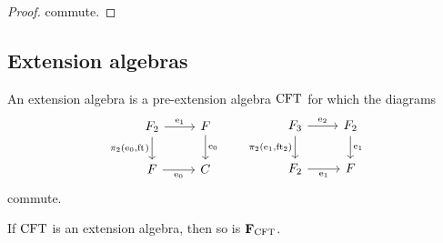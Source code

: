 \begin{proof}
commute.
\begin{comment}
\begin{equation*}
\begin{tikzcd}[column sep=large]
{} &
\stesysf_2'
  \ar{r}{f_2}
  \ar{dr}{\beta_1'}
  &
\stesysf_2
  \ar{ddr}{\pullbackpr{2}{\ectxext}{\eft}}
  \\
{} & {} &
\stesysf'
  \ar{dr}[swap,near start]{f_1}
  \\
\stesysf_3'
  \ar{uur}{\eext{2}'}
  \ar{r}{\beta_2'}
  \ar{dr}[swap]{f_3}
  &
\stesysf_2'
  \ar{r}{f_2}
  \ar{ur}{\efamext'}
  &
\stesysf_2
  \ar{r}[swap]{\efamext}
  &
\stesysf
  \\
{} &
\stesysf_3
  \ar{r}[swap]{\eext{2}}
  \ar{ur}[near start]{\beta_2}
  &
\stesysf_2
  \ar{ur}[swap]{\pullbackpr{2}{\ectxext}{\eft}}
\end{tikzcd}
\end{equation*}
commutes.
\end{comment}
\end{proof}

\subsection{Extension algebras}
\begin{defn} 
An extension algebra is a pre-extension algebra $\mathrm{CFT}$ for which 
the diagrams
\begin{equation*}
\begin{tikzcd}
\stesysf_2 
  \ar{d}[swap]{\pullbackpr{2}{\ectxext}{\eft}} 
  \ar{r}{\efamext} 
  & 
\stesysf 
  \ar{d}{\ectxext}
  \\
\stesysf 
  \ar{r}[swap]{\ectxext} 
  & 
\stesysc
\end{tikzcd}
\qquad
\begin{tikzcd}
\stesysf_3
  \ar{d}[swap]{\pullbackpr{2}{\efamext}{\eft[2]}}
  \ar{r}{\eext{2}}
  & 
\stesysf_2 
  \ar{d}{\efamext} 
  \\
\stesysf_2 
  \ar{r}[swap]{\efamext} 
  &
\stesysf
\end{tikzcd}
\end{equation*}
commute.
\end{defn}

\begin{thm}\label{famextobj}
If $\mathrm{CFT}$ is an extension algebra, then so is $\mathbf{F}_{\mathrm{CFT}}$.
\end{thm}

